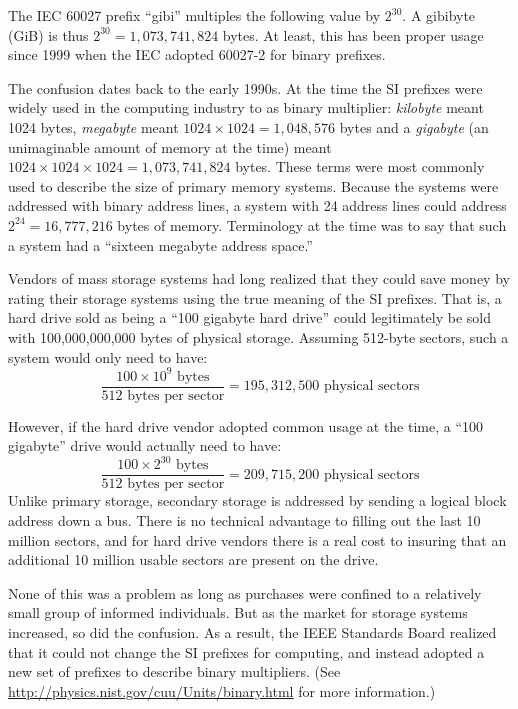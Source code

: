 The IEC 60027 prefix ``gibi'' multiples the following value by $2^{30}$. A gibibyte
(GiB) is thus $2^{30}=1,073,741,824$ bytes. At least, this has been
proper usage since 1999 when the IEC adopted 60027-2 for binary
prefixes. 

The confusion dates back to the early 1990s. At the time the SI
prefixes were widely used in the computing industry to as binary
multiplier: \emph{kilobyte} meant 1024 bytes, \emph{megabyte} meant
$1024\times1024=1,048,576$ bytes and a \emph{gigabyte} (an
unimaginable amount of memory at the time) meant
$1024\times1024\times1024=1,073,741,824$ bytes. These terms were most
commonly used to describe the size of primary memory systems. Because
the systems were addressed with binary address lines, a system with 24
address lines could address $2^{24}=16,777,216$ bytes of
memory. Terminology at the time was to say that such a system had a
``sixteen megabyte address space.''

Vendors of mass storage systems had long realized that they could
save money by rating their storage systems using the true meaning of
the SI prefixes. That is, a hard drive sold as being a ``100 gigabyte
hard drive'' could legitimately be sold with 100,000,000,000 bytes of
physical storage. Assuming 512-byte sectors, such a system would only
need to have:
\begin{equation}
\frac{100 \times 10^9 \textrm{~bytes}}{512 \textrm{~bytes per sector}}=195,312,500 \textrm{~physical sectors}
\end{equation}

However, if the hard drive vendor adopted common usage at the time, a
``100 gigabyte'' drive would actually need to have:
\begin{equation}
\frac{100 \times 2^{30} \textrm{~bytes}}{512 \textrm{~bytes per sector}}=209,715,200 \textrm{~physical sectors}
\end{equation}
Unlike primary storage, secondary storage is addressed by sending a
logical block address down a bus. There is no technical advantage to
filling out the last 10 million sectors, and for hard drive vendors
there is a real cost to insuring that an additional 10 million usable
sectors are present on the drive. 

None of this was a problem as long as purchases were confined to a
relatively small group of informed individuals. But as the market for
storage systems increased, so did the confusion. As a result, the IEEE
Standards Board realized that it could not change the SI prefixes for
computing, and instead adopted a new set of prefixes to describe
binary multipliers. (See
\url{http://physics.nist.gov/cuu/Units/binary.html} for more information.)

